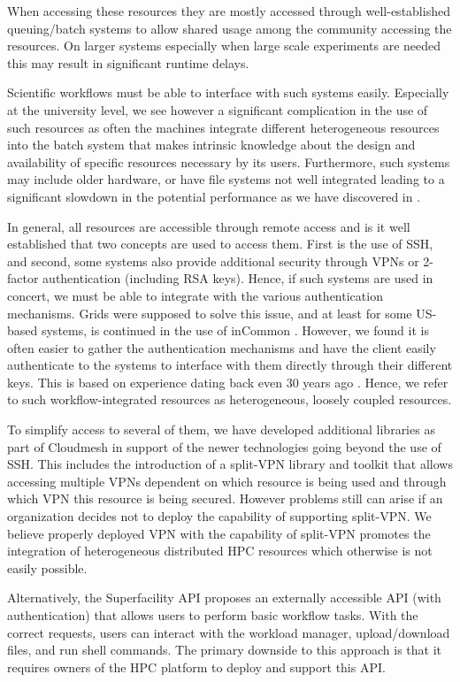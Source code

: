 \documentclass[utf8]{FrontiersinVancouver} %
\begin{document}
When accessing these resources they are mostly accessed through well-established queuing/batch systems to allow shared usage among the community accessing the resources. On larger systems especially when large scale experiments are needed this may result in significant runtime delays.

Scientific workflows must be able to interface with such systems easily. Especially at the university level, we see however a significant complication in the use of such resources as often the machines integrate different heterogeneous resources into the batch system that makes intrinsic knowledge about the design and availability of specific resources necessary by its users. Furthermore, such systems may include older hardware, or have file systems not well integrated leading to a significant slowdown in the potential performance as we have discovered in \citep{las-frontiers-edu}. 

In general, all resources are accessible through remote access and is it well established that two concepts are used to access them. First is the use of SSH, and second, some systems also provide additional security through VPNs or 2-factor authentication (including RSA keys). Hence, if such systems are used in concert, we must be able to integrate with the various authentication mechanisms. Grids were supposed to solve this issue, and at least for some US-based systems, is continued in the use of inCommon \citep{incommon}. However, we found it is often easier to gather the authentication mechanisms and have the client easily authenticate to the systems to interface with them directly through their different keys. This is based on experience dating back even 30 years ago \cite{las-99-loosely}. Hence, we refer to such workflow-integrated resources as heterogeneous, loosely coupled resources.

To simplify access to several of them, we have developed additional libraries as part of Cloudmesh in
support of the newer technologies going beyond the use of SSH. This includes the introduction of a split-VPN library and toolkit that allows accessing multiple VPNs dependent on which resource is being used and through which VPN this resource is being secured. However problems still can arise if an organization decides not to deploy the capability of supporting split-VPN. We believe properly deployed VPN with the capability of split-VPN promotes the integration of heterogeneous distributed HPC resources which otherwise is not easily possible.

Alternatively, the Superfacility API \citep{Enders2020} proposes an externally accessible API (with authentication) that allows users to perform basic workflow tasks. With the correct requests, users can interact with the workload manager, upload/download files, and run shell commands. The primary downside to this approach is that it requires owners of the HPC platform to deploy and support this API.
\end{document}
